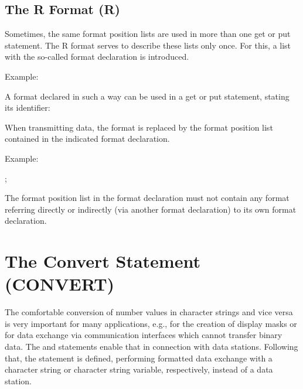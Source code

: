 \subsection{The R Format (R)}   %
\label{sec_dation_r_format}

Sometimes, the same format position lists are used in more than one get
or put statement. The R format serves to describe these lists only
once. For this, a list with the so-called format declaration is
introduced.

\begin{grammarframe}

\end{grammarframe}

Example:

 \code{ ( }

A format declared in such a way can be used in a get or put statement,
stating its identifier:

\begin{grammarframe}

\end{grammarframe}

When transmitting data, the  format is replaced by the format position
list contained in the indicated format declaration.

Example:

 ;

The format position list in the format declaration must not contain any
 format referring directly or indirectly (via another format
declaration) to its own format declaration.

\section{The Convert Statement (CONVERT)}   %
\label{sec_convert}

The comfortable conversion of number values in character strings and
vice versa is very important for many applications, e.g., for the
creation of display masks or for data exchange via communication
interfaces which cannot transfer binary data. The  and 
statements enable that in connection with data stations. Following
that, the  statement is defined, performing formatted data
exchange with a character string or character string variable,
respectively, instead of a data station.

